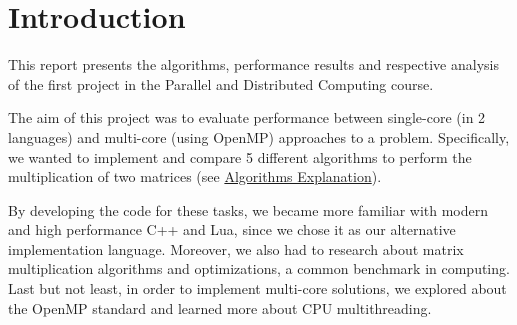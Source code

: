 \section{Introduction} \label{section:introduction}

This report presents the algorithms, performance results and respective analysis of the first project in the Parallel and Distributed Computing course. 

The aim of this project was to evaluate performance between single-core (in 2 languages) and multi-core (using OpenMP) approaches to a problem. Specifically, we wanted to implement and compare 5 different algorithms to perform the multiplication of two matrices (see \hyperref[section:algorithms]{Algorithms Explanation}).

By developing the code for these tasks, we became more familiar with modern and high performance C++ and Lua, since we chose it as our alternative implementation language. Moreover, we also had to research about matrix multiplication algorithms and optimizations, a common benchmark in computing. Last but not least, in order to implement multi-core solutions, we explored about the OpenMP standard and learned more about CPU multithreading. 
